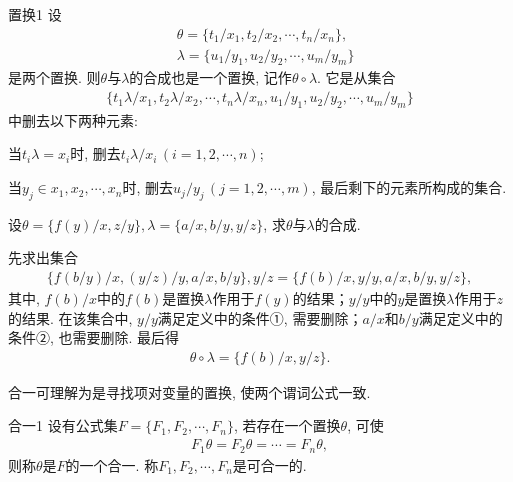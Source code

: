 \begin{mydef}{置换}{1}
设
\begin{align}
    &\theta =\{t_1/x_1,t_2/x_2,\cdots,t_n/x_n\},\\
    &\lambda =\{u_1/y_1, u_2/y_2, \cdots , u_m/y_m \}
\end{align}
是两个置换. 则$\theta$与$\lambda$的合成也是一个置换, 记作$\theta \circ \lambda$. 它是从集合
\begin{align}
  \{ t_1\lambda /x_1, t_2\lambda /x_2, \cdots , t_n\lambda /x_n,  u_1/y_1, u_2/y_2, \cdots , u_m/y_m \}
\end{align}
中删去以下两种元素:

        当$t_i\lambda =x_i$时, 删去$t_i\lambda /x_i\, (i=1, 2 ,\cdots, n)$;

         当$y_j\in { x_1, x_2 ,\cdots, x_n }时$, 删去$u_j/y_j\, (j=1, 2 ,\cdots, m)$, 最后剩下的元素所构成的集合.
\end{mydef}
\begin{example}
  设$\theta =\{ f(y)/x, z/y \}, \lambda =\{a/x, b/y ,y/z \}$, 求$\theta $与$\lambda $的合成.
\end{example}
\begin{result}
先求出集合
\begin{align}
  \{f(b/y)/x, (y/z)/y, a/x, b/y\} , y/z=\{f(b)/x, y/y, a/x, b/y , y/z\},
\end{align}
其中, $f(b)/x$中的$f(b)$是置换$\lambda$作用于$f(y)$的结果；$y/y$中的$y$是置换$\lambda$作用于$z$的结果. 在该集合中, $y/y$满足定义中的条件①, 需要删除；$a/x$和$b/y$满足定义中的条件②, 也需要删除. 最后得
\begin{align}
  \theta \circ \lambda =\{f(b)/x, y/z\}.
\end{align}
\end{result}
\begin{remark}
  合一可理解为是寻找项对变量的置换, 使两个谓词公式一致.
\end{remark}

\begin{mydef}{合一}{1}
设有公式集$F=\{F_1, F_2,\cdots,F_n\}$, 若存在一个置换$\theta$, 可使
\begin{align}
  F_1\theta =F_2\theta =\cdots=F_n\theta ,
\end{align}
则称$\theta$是$F$的一个合一. 称$F_1,F_2,\cdots,F_n$是可合一的.
\end{mydef}

